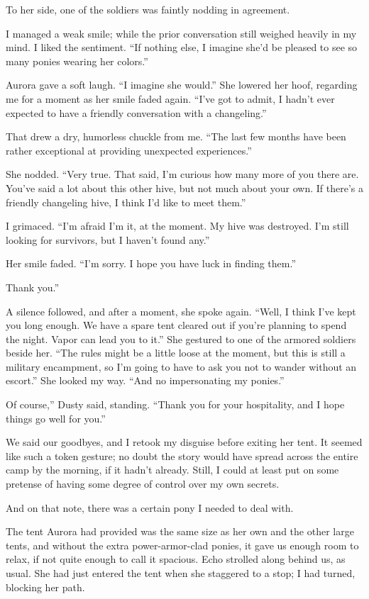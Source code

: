 To her side, one of the soldiers was faintly nodding in agreement.

I managed a weak smile; while the prior conversation still weighed heavily in my mind. I liked the sentiment. “If nothing else, I imagine she’d be pleased to see so many ponies wearing her colors.”

Aurora gave a soft laugh. “I imagine she would.” She lowered her hoof, regarding me for a moment as her smile faded again. “I’ve got to admit, I hadn’t ever expected to have a friendly conversation with a changeling.”

That drew a dry, humorless chuckle from me. “The last few months have been rather exceptional at providing unexpected experiences.”

She nodded. “Very true. That said, I’m curious how many more of you there are. You’ve said a lot about this other hive, but not much about your own. If there’s a friendly changeling hive, I think I’d like to meet them.”

I grimaced. “I’m afraid I’m it, at the moment. My hive was destroyed. I’m still looking for survivors, but I haven’t found any.”

Her smile faded. “I’m sorry. I hope you have luck in finding them.”

\leavevmode{}Thank you.”

A silence followed, and after a moment, she spoke again. “Well, I think I’ve kept you long enough. We have a spare tent cleared out if you’re planning to spend the night. Vapor can lead you to it.” She gestured to one of the armored soldiers beside her. “The rules might be a little loose at the moment, but this is still a military encampment, so I’m going to have to ask you not to wander without an escort.” She looked my way. “And no impersonating my ponies.”

\leavevmode{}Of course,” Dusty said, standing. “Thank you for your hospitality, and I hope things go well for you.”

We said our goodbyes, and I retook my disguise before exiting her tent. It seemed like such a token gesture; no doubt the story would have spread across the entire camp by the morning, if it hadn’t already. Still, I could at least put on some pretense of having some degree of control over my own secrets.

And on that note, there was a certain pony I needed to deal with.

The tent Aurora had provided was the same size as her own and the other large tents, and without the extra power-armor-clad ponies, it gave us enough room to relax, if not quite enough to call it spacious. Echo strolled along behind us, as usual. She had just entered the tent when she staggered to a stop; I had turned, blocking her path.

